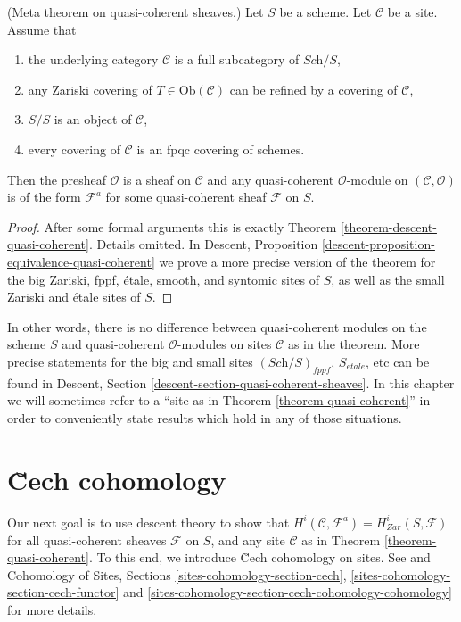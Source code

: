 \begin{theorem}
\label{theorem-quasi-coherent}
(Meta theorem on quasi-coherent sheaves.)
Let $S$ be a scheme.
Let $\mathcal{C}$ be a site. Assume that
\begin{enumerate}
\item the underlying category $\mathcal{C}$ is a
full subcategory of $\textit{Sch}/S$,
\item any Zariski covering of $T \in \text{Ob}(\mathcal{C})$
can be refined by a covering of $\mathcal{C}$,
\item $S/S$ is an object of $\mathcal{C}$,
\item every covering of $\mathcal{C}$ is an fpqc covering of schemes.
\end{enumerate}
Then the presheaf $\mathcal{O}$ is a sheaf on $\mathcal{C}$ and
any quasi-coherent $\mathcal{O}$-module on $(\mathcal{C}, \mathcal{O})$
is of the form $\mathcal{F}^a$ for some quasi-coherent sheaf
$\mathcal{F}$ on $S$.
\end{theorem}

\begin{proof}
After some formal arguments this is exactly Theorem
\ref{theorem-descent-quasi-coherent}. Details omitted. In
Descent, Proposition \ref{descent-proposition-equivalence-quasi-coherent}
we prove a more precise version of the theorem for the
big Zariski, fppf, \'etale, smooth, and syntomic sites of $S$,
as well as the small Zariski and \'etale sites of $S$.
\end{proof}

\noindent
In other words, there is no difference between quasi-coherent
modules on the scheme $S$ and quasi-coherent $\mathcal{O}$-modules
on sites $\mathcal{C}$ as in the theorem. More precise statements
for the big and small sites $(\textit{Sch}/S)_{fppf}$, $S_{etale}$, etc
can be found in
Descent, Section \ref{descent-section-quasi-coherent-sheaves}.
In this chapter we will sometimes refer to a
``site as in Theorem \ref{theorem-quasi-coherent}''
in order to conveniently state results which hold in any of those
situations.






\section{\u Cech cohomology}
\label{section-cech-cohomology}

\noindent
Our next goal is to use descent theory to show that
$H^i(\mathcal{C}, \mathcal{F}^a) = H_{Zar}^i(S, \mathcal{F})$
for all quasi-coherent sheaves $\mathcal{F}$ on $S$, and
any site $\mathcal{C}$ as in Theorem \ref{theorem-quasi-coherent}.
To this end, we introduce \u Cech cohomology on sites.
See \cite{ArtinTopologies} and
Cohomology of Sites, Sections \ref{sites-cohomology-section-cech},
\ref{sites-cohomology-section-cech-functor}
and \ref{sites-cohomology-section-cech-cohomology-cohomology}
for more details.

